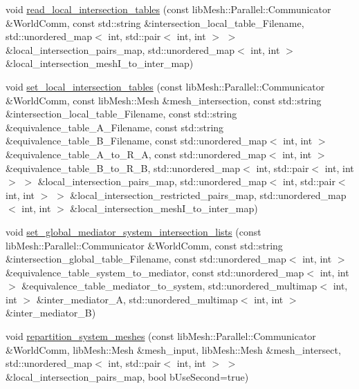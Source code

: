 \begin{DoxyCompactItemize}
\item 
void \hyperlink{namespacecarl_aeceaf9a878847b9ea2f623aa51e3b392}{read\+\_\+local\+\_\+intersection\+\_\+tables} (const lib\+Mesh\+::\+Parallel\+::\+Communicator \&World\+Comm, const std\+::string \&intersection\+\_\+local\+\_\+table\+\_\+\+Filename, std\+::unordered\+\_\+map$<$ int, std\+::pair$<$ int, int $>$ $>$ \&local\+\_\+intersection\+\_\+pairs\+\_\+map, std\+::unordered\+\_\+map$<$ int, int $>$ \&local\+\_\+intersection\+\_\+mesh\+I\+\_\+to\+\_\+inter\+\_\+map)
\item 
void \hyperlink{namespacecarl_a8d1c90daac3238ed5d53465740e072b3}{set\+\_\+local\+\_\+intersection\+\_\+tables} (const lib\+Mesh\+::\+Parallel\+::\+Communicator \&World\+Comm, const lib\+Mesh\+::\+Mesh \&mesh\+\_\+intersection, const std\+::string \&intersection\+\_\+local\+\_\+table\+\_\+\+Filename, const std\+::string \&equivalence\+\_\+table\+\_\+\+A\+\_\+\+Filename, const std\+::string \&equivalence\+\_\+table\+\_\+\+B\+\_\+\+Filename, const std\+::unordered\+\_\+map$<$ int, int $>$ \&equivalence\+\_\+table\+\_\+\+A\+\_\+to\+\_\+\+R\+\_\+\+A, const std\+::unordered\+\_\+map$<$ int, int $>$ \&equivalence\+\_\+table\+\_\+\+B\+\_\+to\+\_\+\+R\+\_\+\+B, std\+::unordered\+\_\+map$<$ int, std\+::pair$<$ int, int $>$ $>$ \&local\+\_\+intersection\+\_\+pairs\+\_\+map, std\+::unordered\+\_\+map$<$ int, std\+::pair$<$ int, int $>$ $>$ \&local\+\_\+intersection\+\_\+restricted\+\_\+pairs\+\_\+map, std\+::unordered\+\_\+map$<$ int, int $>$ \&local\+\_\+intersection\+\_\+mesh\+I\+\_\+to\+\_\+inter\+\_\+map)
\item 
void \hyperlink{namespacecarl_ab4df2c3a7c53c68fc2628569f4b4bd17}{set\+\_\+global\+\_\+mediator\+\_\+system\+\_\+intersection\+\_\+lists} (const lib\+Mesh\+::\+Parallel\+::\+Communicator \&World\+Comm, const std\+::string \&intersection\+\_\+global\+\_\+table\+\_\+\+Filename, const std\+::unordered\+\_\+map$<$ int, int $>$ \&equivalence\+\_\+table\+\_\+system\+\_\+to\+\_\+mediator, const std\+::unordered\+\_\+map$<$ int, int $>$ \&equivalence\+\_\+table\+\_\+mediator\+\_\+to\+\_\+system, std\+::unordered\+\_\+multimap$<$ int, int $>$ \&inter\+\_\+mediator\+\_\+\+A, std\+::unordered\+\_\+multimap$<$ int, int $>$ \&inter\+\_\+mediator\+\_\+\+B)
\item 
void \hyperlink{namespacecarl_ad1869df8fcc16b806a4c0b262922672f}{repartition\+\_\+system\+\_\+meshes} (const lib\+Mesh\+::\+Parallel\+::\+Communicator \&World\+Comm, lib\+Mesh\+::\+Mesh \&mesh\+\_\+input, lib\+Mesh\+::\+Mesh \&mesh\+\_\+intersect, std\+::unordered\+\_\+map$<$ int, std\+::pair$<$ int, int $>$ $>$ \&local\+\_\+intersection\+\_\+pairs\+\_\+map, bool b\+Use\+Second=true)

\end{DoxyCompactItemize}

